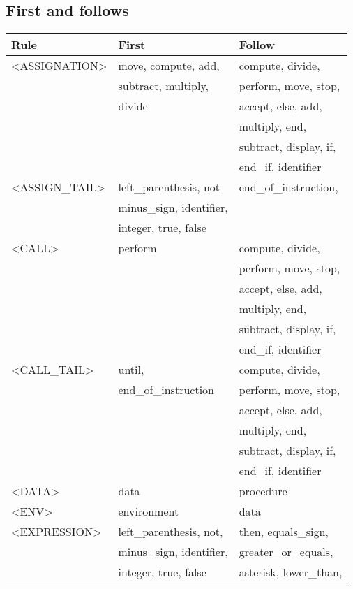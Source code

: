 \subsection{First and follows}


\begin{longtable}{|l|l|l|}
\hline
Rule                 &   First                &   Follow               \\
\hline
<ASSIGNATION>  &  move, compute, add, &   compute, divide, \\ 
  &  subtract, multiply, &   perform, move, stop, \\ 
  &  divide &   accept, else, add, \\ 
  &  &   multiply, end, \\ 
  &  &   subtract, display, if, \\ 
  &  &   end\_if, identifier \\ 
  \hline
<ASSIGN\_TAIL>  &  left\_parenthesis, not &   end\_of\_instruction, \\ 
  &  minus\_sign, identifier, &   \\ 
  &  integer, true, false &   \\ 
  \hline
<CALL>  &  perform &   compute, divide, \\ 
  &  &   perform, move, stop, \\ 
  &  &   accept, else, add, \\ 
  &  &   multiply, end, \\ 
  &  &   subtract, display, if, \\ 
  &  &   end\_if, identifier \\ 
  \hline
<CALL\_TAIL>  &  until, &   compute, divide, \\ 
  &  end\_of\_instruction &   perform, move, stop, \\ 
  &  &   accept, else, add, \\ 
  &  &   multiply, end, \\ 
  &  &   subtract, display, if, \\ 
  &  &   end\_if, identifier \\ 
  \hline
<DATA>  &  data &   procedure \\ 
  \hline
<ENV>  &  environment &   data \\ 
  \hline
<EXPRESSION>  &  left\_parenthesis, not, &   then, equals\_sign, \\ 
  &  minus\_sign, identifier, &   greater\_or\_equals, \\ 
  &  integer, true, false &   asterisk, lower\_than, \\ 

\end{longtable}
